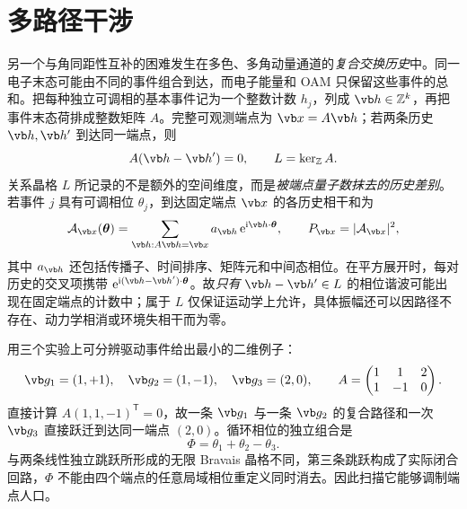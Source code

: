 \section{多路径干涉}
另一个与角同距性互补的困难发生在多色、多角动量通道的\emph{复合交换历史}中。同一电子末态可能由不同的事件组合到达，而电子能量和 OAM 只保留这些事件的总和。把每种独立可调相的基本事件记为一个整数计数 $h_j$，列成 $\vb h\in\mathbb Z^k$，再把事件末态荷排成整数矩阵 $A$。完整可观测端点为 $\vb x=A\vb h$；若两条历史 $\vb h,\vb h'$ 到达同一端点，则
\begin{equation}
 A(\vb h-\vb h')=0,
 \qquad L=\ker_{\mathbb Z}A.
 \label{eq:oam-relation-lattice}
\end{equation}
关系晶格 $L$ 所记录的不是额外的空间维度，而是\emph{被端点量子数抹去的历史差别}。若事件 $j$ 具有可调相位 $\theta_j$，到达固定端点 $\vb x$ 的各历史相干和为
\begin{equation}
 \mathcal A_{\vb x}(\boldsymbol\theta)
 =\sum_{\vb h:A\vb h=\vb x}
 a_{\vb h}\,\ee^{\ii\vb h\cdot\boldsymbol\theta},
 \qquad P_{\vb x}=|\mathcal A_{\vb x}|^2,
 \label{eq:oam-history-amplitude}
\end{equation}
其中 $a_{\vb h}$ 还包括传播子、时间排序、矩阵元和中间态相位。在平方展开时，每对历史的交叉项携带 $\ee^{\ii(\vb h-\vb h')\cdot\boldsymbol\theta}$。故\emph{只有} $\vb h-\vb h'\in L$ 的相位谐波可能出现在固定端点的计数中；属于 $L$ 仅保证运动学上允许，具体振幅还可以因路径不存在、动力学相消或环境失相干而为零。

用三个实验上可分辨驱动事件给出最小的二维例子：
\begin{equation}
 \vb g_1=(1,+1),\quad \vb g_2=(1,-1),\quad \vb g_3=(2,0),\qquad
 A=\begin{pmatrix}1&1&2\\1&-1&0\end{pmatrix}.
 \label{eq:oam-three-channel-matrix}
\end{equation}
直接计算 $A(1,1,-1)^{\mathsf T}=0$，故一条 $\vb g_1$ 与一条 $\vb g_2$ 的复合路径和一次 $\vb g_3$ 直接跃迁到达同一端点 $(2,0)$。循环相位的独立组合是
\begin{equation}
 \Phi=\theta_1+\theta_2-\theta_3.
 \label{eq:oam-primitive-loop-phase}
\end{equation}
与两条线性独立跳跃所形成的无限 Bravais 晶格不同，第三条跳跃构成了实际闭合回路，$\Phi$ 不能由四个端点的任意局域相位重定义同时消去。因此扫描它能够调制端点人口。

